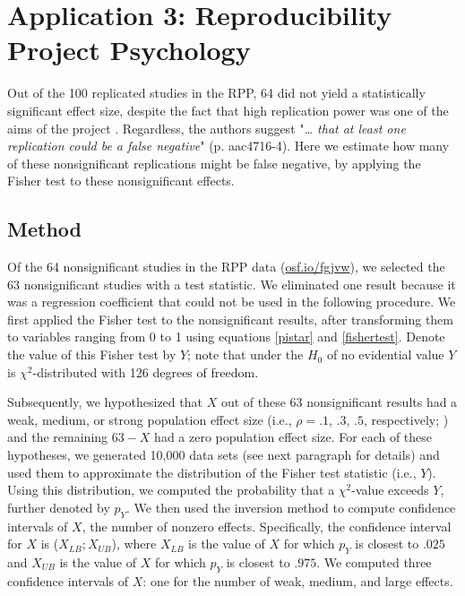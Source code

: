 \documentclass{article}
\begin{document}
\section*{Application 3: Reproducibility Project Psychology}

Out of the 100 replicated studies in the RPP, 64 did not yield a statistically significant effect size, despite the fact that high replication power was one of the aims of the project \cite{Open_Science_Collaboration2015-zs}. Regardless, the authors suggest "\textit{… that at least one replication could be a false negative}" (p. aac4716-4). Here we estimate how many of these nonsignificant replications might be false negative, by applying the Fisher test to these nonsignificant effects.

\subsection*{Method}

Of the 64 nonsignificant studies in the RPP data (\url{osf.io/fgjvw}), we selected the 63 nonsignificant studies with a test statistic. We eliminated one result because it was a regression coefficient that could not be used in the following procedure. We first applied the Fisher test to the nonsignificant results, after transforming them to variables ranging from 0 to 1 using equations \ref{pistar} and \ref{fishertest}. Denote the value of this Fisher test by $Y$; note that under the $H_0$ of no evidential value $Y$ is $\chi^2$-distributed with 126 degrees of freedom.

Subsequently, we hypothesized that $X$ out of these 63 nonsignificant results had a weak, medium, or strong population effect size (i.e., $\rho=.1$, $.3$, $.5$, respectively; \cite{Cohen1988-wg}) and the remaining $63-X$ had a zero population effect size. For each of these hypotheses, we generated 10,000 data sets (see next paragraph for details) and used them to approximate the distribution of the Fisher test statistic (i.e., $Y$). Using this distribution, we computed the probability that a $\chi^2$-value exceeds $Y$, further denoted by $p_Y$. We then used the inversion method \cite{Casella2002-cy} to compute confidence intervals of $X$, the number of nonzero effects. Specifically, the confidence interval for $X$ is ($X_{LB};X_{UB}$), where $X_{LB}$ is the value of $X$ for which $p_Y$ is closest to $.025$ and $X_{UB}$ is the value of $X$ for which $p_Y$ is closest to $.975$. We computed three confidence intervals of $X$: one for the number of weak, medium, and large effects.
\end{document}
